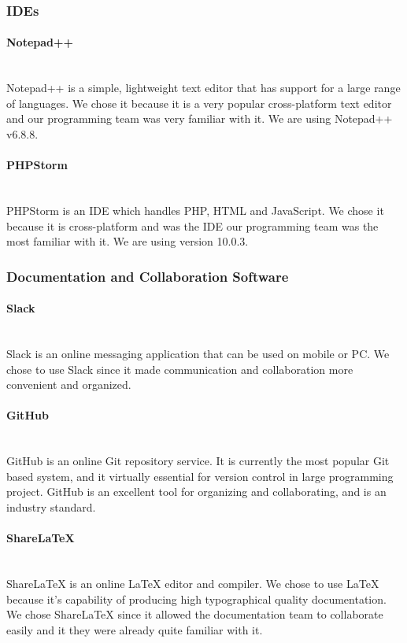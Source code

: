 \documentclass[12pt]{article}
\begin{document}
\subsubsection{IDEs}
\paragraph*{Notepad++}~\\
Notepad++ is a simple, lightweight text editor that has support for a large range of languages. We chose it because it is a very popular cross-platform text editor and our programming team was very familiar with it. We are using Notepad++ v6.8.8.
%
\paragraph*{PHPStorm}~\\
PHPStorm is an IDE which handles PHP, HTML and JavaScript. We chose it because it is cross-platform and was the IDE our programming team was the most familiar with it. We are using version 10.0.3.
%
%
%
\subsubsection{Documentation and Collaboration Software}
\paragraph*{Slack}~\\
Slack is an online messaging application that can be used on mobile or PC. We chose to use Slack since it made communication and collaboration more convenient and organized.
%
\paragraph*{GitHub}~\\
GitHub is an online Git repository service. It is currently the most popular Git based system, and it virtually essential for version control in large programming project. GitHub is an excellent tool for organizing and collaborating, and is an industry standard.
%
\paragraph*{ShareLaTeX}~\\
ShareLaTeX is an online LaTeX editor and compiler. We chose to use LaTeX because it's capability of producing high typographical quality documentation. We chose ShareLaTeX since it allowed the documentation team to collaborate easily and it they were already quite familiar with it. 
%
\end{document}
